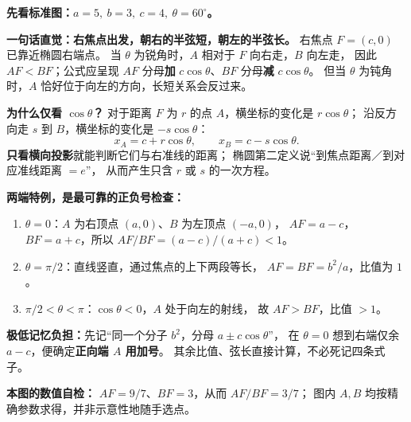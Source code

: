 \begin{explanationbox}
\textbf{先看标准图：$a=5,\ b=3,\ c=4,\ \theta=60^\circ$。}
\begin{center}

\end{center}
\textbf{一句话直觉：右焦点出发，朝右的半弦短，朝左的半弦长。}
右焦点 $F=(c,0)$ 已靠近椭圆右端点。
当 $\theta$ 为锐角时，$A$ 相对于 $F$ 向右走，$B$ 向左走，
因此 $AF<BF$；公式应呈现
$AF$ 分母\textbf{加} $c\cos\theta$、$BF$ 分母\textbf{减} $c\cos\theta$。
但当 $\theta$ 为钝角时，$A$ 恰好位于向左的方向，长短关系会反过来。
\par\smallskip\noindent
\textbf{为什么仅看 $\cos\theta$？}
对于距离 $F$ 为 $r$ 的点 $A$，横坐标的变化是 $r\cos\theta$；
沿反方向走 $s$ 到 $B$，横坐标的变化是 $-s\cos\theta$：
\[
 x_A=c+r\cos\theta,\qquad x_B=c-s\cos\theta.
\]
\textbf{只看横向投影}就能判断它们与右准线的距离；
椭圆第二定义说``到焦点距离／到对应准线距离 $=e$''，
从而产生只含 $r$ 或 $s$ 的一次方程。
\par\smallskip\noindent
\textbf{两端特例，是最可靠的正负号检查：}
\begin{enumerate}
 \item $\theta=0$：$A$ 为右顶点 $(a,0)$、$B$ 为左顶点 $(-a,0)$，
 $AF=a-c$，$BF=a+c$，所以 $AF/BF=(a-c)/(a+c)<1$。
 \item $\theta=\pi/2$：直线竖直，通过焦点的上下两段等长，
 $AF=BF=b^2/a$，比值为 $1$。
 \item $\pi/2<\theta<\pi$：$\cos\theta<0$，$A$ 处于向左的射线，
 故 $AF>BF$，比值 $>1$。
\end{enumerate}
\textbf{极低记忆负担：}先记``同一个分子 $b^2$，分母 $a\pm c\cos\theta$''，
在 $\theta=0$ 想到右端仅余 $a-c$，便确定\textbf{正向端 $A$ 用加号}。
其余比值、弦长直接计算，不必死记四条式子。
\par\smallskip\noindent
\textbf{本图的数值自检：}
$AF=9/7$、$BF=3$，从而 $AF/BF=3/7$；
图内 $A,B$ 均按精确参数求得，并非示意性地随手选点。
\end{explanationbox}
